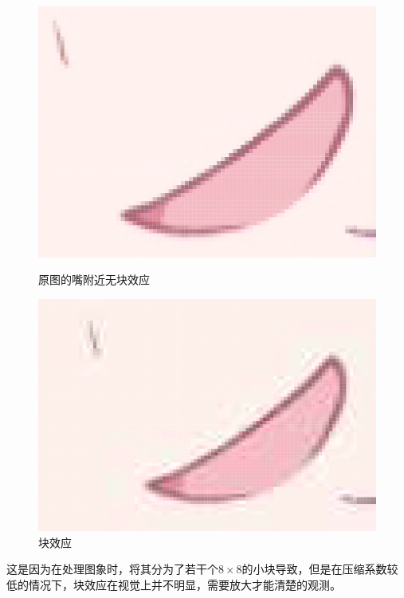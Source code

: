 \documentclass{article}
\begin{document}
\begin{figure}[htbp]
    \centering
    \begin{minipage}[t]{0.45\textwidth}
        \centering
        \includegraphics[width=\textwidth]{assets/2_block.png}
        \caption{原图的嘴附近无块效应}
    \end{minipage}
    \hfill  %
    \begin{minipage}[t]{0.45\textwidth}
        \centering
        \includegraphics[width=\textwidth]{assets/2_block_compressed.png}
        \caption{块效应}
    \end{minipage}
\end{figure}
\FloatBarrier
这是因为在处理图象时，将其分为了若干个$8\times 8$的小块导致，但是在压缩系数较低的情况下，块效应在视觉上并不明显，需要放大才能清楚的观测。
\end{document}
